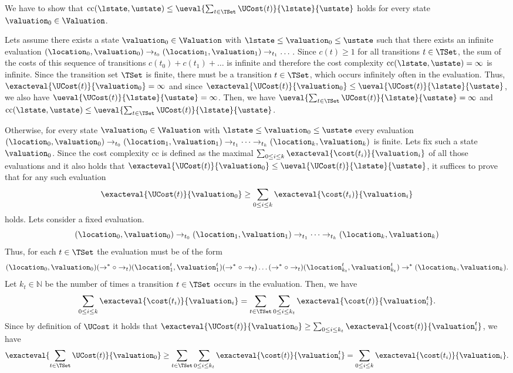 We have to show that $\text{cc}(\lstate, \ustate) \leq \ueval{\sum_{t \in \TSet}\UCost(t)}{\lstate}{\ustate}$ holds for every state $\valuation_0 \in \Valuation$.

Lets assume there exists a state $\valuation_0 \in \Valuation$ with $\lstate \leq \valuation_0 \leq \ustate$ such that there exists an infinite evaluation $(\location_0, \valuation_0) \rightarrow_{t_0} (\location_1, \valuation_1) \rightarrow_{t_1} \dots$.
Since $c(t) \geq 1$ for all transitions $t \in \TSet$, the sum of the costs of this sequence of transitions $c(t_0) + c(t_1) + \dots$ is infinite and therefore the cost complexity $\text{cc}(\lstate, \ustate) = \infty$ is infinite.
Since the transition set $\TSet$ is finite, there must be a transition $t \in \TSet$, which occurs infinitely often in the evaluation.
Thus, $\exacteval{\UCost(t)}{\valuation_0} = \infty$ and since $\exacteval{\UCost(t)}{\valuation_0} \leq \ueval{\UCost(t)}{\lstate}{\ustate}$, we also have $\ueval{\UCost(t)}{\lstate}{\ustate} = \infty$.
Then, we have $\ueval{\sum_{t \in \TSet}\UCost(t)}{\lstate}{\ustate} = \infty$ and $\text{cc}(\lstate, \ustate) \leq \ueval{\sum_{t \in \TSet}\UCost(t)}{\lstate}{\ustate}$.

Otherwise, for every state $\valuation_0 \in \Valuation$ with $\lstate \leq \valuation_0 \leq \ustate$ every evaluation $(\location_0, \valuation_0) \rightarrow_{t_0} (\location_1, \valuation_1) \rightarrow_{t_1} \dots \rightarrow_{t_k} (\location_k, \valuation_k)$ is finite.
Lets fix such a state $\valuation_0$.
Since the cost complexity $\text{cc}$ is defined as the maximal $\sum_{0 \leq i \leq k} \exacteval{\cost(t_i)}{\valuation_i}$ of all those evaluations and it also holds that $\exacteval{\UCost(t)}{\valuation_0} \leq \ueval{\UCost(t)}{\lstate}{\ustate}$, it suffices to prove that for any such evaluation \[ \exacteval{\UCost(t)}{\valuation_0} \geq \sum_{0 \leq i \leq k} \exacteval{\cost(t_i)}{\valuation_i} \] holds.
Lets consider a fixed evaluation.
\[ (\location_0, \valuation_0) \rightarrow_{t_0} (\location_1, \valuation_1) \rightarrow_{t_1} \dots \rightarrow_{t_k} (\location_k, \valuation_k) \]
Thus, for each $t \in \TSet$ the evaluation must be of the form
\[ (\location_0, \valuation_0) (\rightarrow^* \circ \rightarrow_t) (\location^t_1, \valuation^t_1) (\rightarrow^* \circ \rightarrow_t) \dots (\rightarrow^* \circ \rightarrow_t) (\location^t_{k_t}, \valuation^t_{k_t}) \rightarrow^* (\location_k, \valuation_k). \]
Let $k_t \in \mathbb{N}$ be the number of times a transition $t \in \TSet$ occurs in the evaluation.
Then, we have \[ \sum_{0 \leq i \leq k} \exacteval{\cost(t_i)}{\valuation_i} = \sum_{t \in \TSet} \sum_{0 \leq i \leq k_t} \exacteval{\cost(t)}{\valuation^t_i}. \]
Since by definition of $\UCost$ it holds that $\exacteval{\UCost(t)}{\valuation_0} \geq \sum_{0 \leq i \leq k_t} \exacteval{\cost(t)}{\valuation^t_i}$, we have \[ \exacteval{\sum_{t \in \TSet}\UCost(t)}{\valuation_0} \geq \sum_{t \in \TSet} \sum_{0 \leq i \leq k_t} \exacteval{\cost(t)}{\valuation^t_i} = \sum_{0 \leq i \leq k} \exacteval{\cost(t_i)}{\valuation_i}. \]

